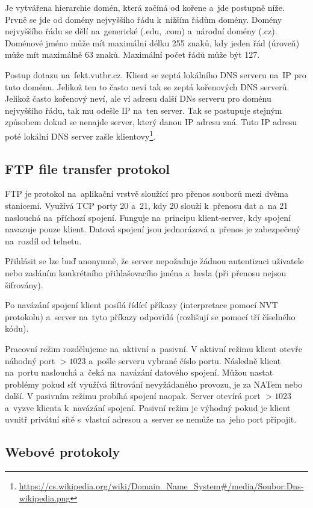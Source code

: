 Je vytvářena hierarchie domén, která začíná od kořene a~jde postupně níže. Prvně se jde od domény nejvyššího řádu k~nižším řádům domény. Domény nejvyššího řádu se dělí na~generické (.edu, .com) a~národní domény (.cz). Doménové jméno může mít maximální délku 255 znaků, kdy jeden řád (úroveň) může mít maximálně 63 znaků. Maximální počet řádů může být 127.

Postup dotazu na~fekt.vutbr.cz. Klient se zeptá lokálního DNS serveru na~IP pro tuto doménu. Jelikož ten to často neví tak se zeptá kořenových DNS serverů. Jelikož často kořenový neví, ale ví adresu další DNs serveru pro doménu nejvyššího řádu, tak mu odešle IP na~ten server. Tak se postupuje stejným způsobem dokud se nenajde server, který danou IP adresu zná. Tuto IP adresu poté lokální DNS server zašle klientovy\footnote{\url{https://cs.wikipedia.org/wiki/Domain_Name_System\#/media/Soubor:Dns-wikipedia.png}}.

\subsection{FTP file transfer protokol}

FTP je protokol na~aplikační vrstvě sloužící pro přenos souborů mezi dvěma stanicemi. Využívá TCP porty 20 a~21, kdy 20 slouží k~přenosu dat a~na 21 naslouchá na~příchozí spojení. Funguje na~principu klient-server, kdy spojení navazuje pouze klient. Datová spojení jsou jednorázová a~přenos je zabezpečený na~rozdíl od telnetu.

Přihlásit se lze buď anonymně, že server nepožaduje žádnou autentizaci uživatele nebo zadáním konkrétního přihlašovacího jména a~hesla (při přenosu nejsou šifrovány).

Po navázání spojení klient posílá řídící příkazy (interpretace pomocí NVT protokolu) a~server na~tyto příkazy odpovídá (rozlišují se pomocí tří číselného kódu).

Pracovní režim rozdělujeme na~aktivní a~pasivní. V aktivní režimu klient otevře náhodný port $> 1023$ a~pošle serveru vybrané číslo portu. Následně klient na~portu naslouchá a~čeká na~navázání datového spojení. Můžou nastat problémy pokud síť využívá filtrování nevyžádaného provozu, je za NATem nebo další. V pasivním režimu probíhá spojení naopak. Server otevírá port $> 1023$ a~vyzve klienta k~navázání spojení. Pasivní režim je výhodný pokud je klient uvnitř privátní sítě s~vlastní adresou a~server se nemůže na~jeho port připojit.

\subsection{Webové protokoly}

